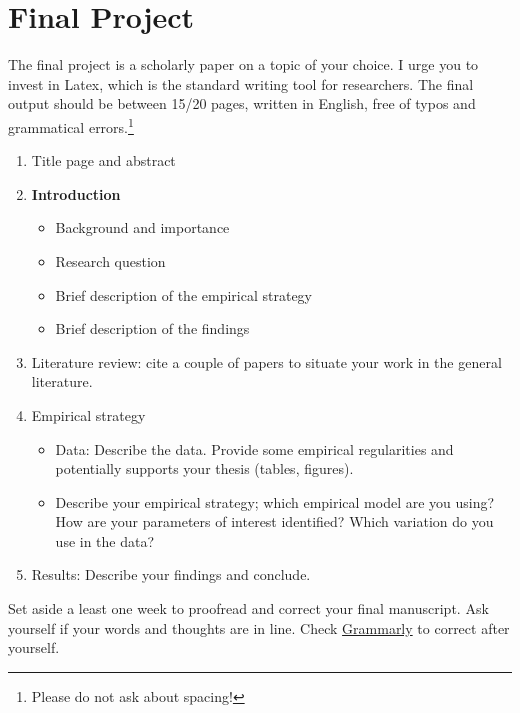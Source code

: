 \documentclass[a4paper,10pt]{article}
\begin{document}
\newpage
\section*{Final Project}
The final project is a scholarly paper on a topic of your choice. I urge you to invest in Latex, which is the standard writing tool for researchers. The final output should be between 15/20 pages, written in English, free of typos and grammatical errors.\footnote{Please do not ask about spacing!}

\begin{enumerate}
\item Title page and abstract 
\item \textbf{Introduction}
\begin{itemize}
 \item Background and importance
 \item Research question
 \item Brief description of the empirical strategy
 \item Brief description of the findings
\end{itemize}
\item Literature review: cite a couple of papers to situate your work in the general literature.
\item Empirical strategy
\begin{itemize}
 \item Data: Describe the data. Provide some empirical regularities and potentially supports your thesis (tables, figures).
\item Describe your empirical strategy; which empirical model are you using? How are your parameters of interest identified? Which variation do you use in the data?
\end{itemize}
\item Results: Describe your findings and conclude. 
\end{enumerate}

Set aside a least one week to proofread and correct your final manuscript. Ask yourself if your words and thoughts are in line. Check \href{https://app.grammarly.com/}{Grammarly} to correct after yourself.
\end{document}
